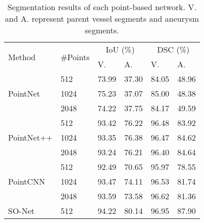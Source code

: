 \documentclass[10pt,twocolumn,letterpaper]{article}
\begin{document}
\begin{table}
\small
\centering
\caption{Segmentation results of each point-based network. V. and A. represent parent vessel segments and aneurysm segments.} \label{tab:seg}
\begin{tabular}{l|lllll} 
\toprule
\multirow{2}{*}{Method} & \multicolumn{1}{l}{\multirow{2}{*}{\#Points}} & \multicolumn{2}{c}{IoU (\%)} & \multicolumn{2}{c}{DSC (\%)} \\
& \multicolumn{1}{l}{} & V. & \multicolumn{1}{l}{A.} & V. & A. \\ 
\hline
\multirow{3}{*}{PointNet \cite{qi2017pointnet}}     & \cellcolor{Apricot}512  & \cellcolor{Apricot}73.99 & \cellcolor{Apricot}37.30 & \cellcolor{Apricot}84.05 & \cellcolor{Apricot}48.96 \\
                                                    & 1024 & 75.23 & 37.07 & 85.00 & 48.38 \\
                                                    & \cellcolor{Lavender}2048 & \cellcolor{Lavender}74.22 & \cellcolor{Lavender}37.75 & \cellcolor{Lavender}84.17 & \cellcolor{Lavender}49.59 \\ 
\hline
\multirow{3}{*}{PointNet++ \cite{qi2017pointnet2}}  & \cellcolor{Apricot}512  & \cellcolor{Apricot}93.42 & \cellcolor{Apricot}76.22 & \cellcolor{Apricot}96.48 & \cellcolor{Apricot}83.92 \\
                                                    & 1024 & 93.35 & 76.38 & 96.47 & 84.62 \\
                                                    & \cellcolor{Lavender}2048 & \cellcolor{Lavender}93.24 & \cellcolor{Lavender}76.21 & \cellcolor{Lavender}96.40 & \cellcolor{Lavender}84.64 \\ 
\hline
\multirow{3}{*}{PointCNN \cite{pointcnn}}           & \cellcolor{Apricot}512  & \cellcolor{Apricot}92.49 & \cellcolor{Apricot}70.65 & \cellcolor{Apricot}95.97 & \cellcolor{Apricot}78.55 \\
                                                    & 1024 & 93.47 & 74.11 & 96.53 & 81.74 \\
                                                    & \cellcolor{Lavender}2048 & \cellcolor{Lavender}93.59 & \cellcolor{Lavender}73.58 & \cellcolor{Lavender}96.62 & \cellcolor{Lavender}81.36 \\ 
\hline
\multirow{3}{*}{SO-Net \cite{sonet}}                & \cellcolor{Apricot}512  & \cellcolor{Apricot}94.22 & \cellcolor{Apricot}80.14 & \cellcolor{Apricot}96.95 & \cellcolor{Apricot}87.90 \\

\end{tabular}
\end{table}
\end{document}
